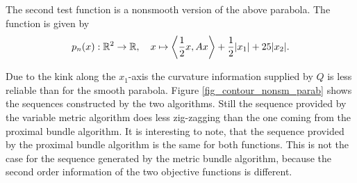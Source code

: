 The second test function is a nonsmooth version of the above parabola. The function is given by 
\[ p_n(x): \mathbb{R}^2 \to \mathbb{R}, \quad x \mapsto \left\langle \frac{1}{2}x, Ax \right\rangle + \frac{1}{2}|x_1|+25|x_2|. \]

Due to the kink along the \(x_1\)-axis the curvature information supplied by \(Q\) is less reliable than for the smooth parabola.
Figure \ref{fig_contour_nonsm_parab} shows the sequences constructed by the two algorithms. Still the sequence provided by the variable metric algorithm does less zig-zagging than the one coming from the proximal bundle algorithm.
It is interesting to note, that the sequence provided by the proximal bundle algorithm is the same for both functions. This is not the case for the sequence generated by the metric bundle algorithm, because the second order information of the two objective functions is different.

